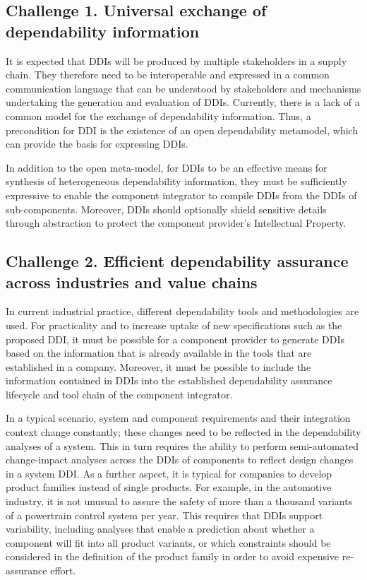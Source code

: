 \subsection{Challenge 1. Universal exchange of dependability information}
It is expected that DDIs will be produced by multiple stakeholders in a supply chain. They therefore need to be interoperable and expressed in a common communication language that can be understood by stakeholders and mechanisms undertaking the generation and evaluation of DDIs. Currently, there is a lack of a common model for the exchange of dependability information. Thus, a precondition for DDI is the existence of an open dependability metamodel, which can provide the basis for expressing DDIs. 

In addition to the open meta-model, for DDIs to be an effective means for synthesis of heterogeneous dependability information, they must be sufficiently expressive to enable the component integrator to compile DDIs from the DDIs of sub-components. Moreover, DDIs should optionally shield sensitive details through abstraction to protect the component provider’s Intellectual Property. 

\subsection{Challenge 2. Efficient dependability assurance across industries and value chains}
In current industrial practice, different dependability tools and methodologies are used. For practicality and to increase uptake of new specifications such as the proposed DDI, it must be possible for a component provider to generate DDIs based on the information that is already available in the tools that are established in a company. Moreover, it must be possible to include the information contained in DDIs into the established dependability assurance lifecycle and tool chain of the component integrator. 

In a typical scenario, system and component requirements and their integration context change constantly; these changes need to be reflected in the dependability analyses of a system. This in turn requires the ability to perform semi-automated change-impact analyses across the DDIs of components to reflect design changes in a system DDI. As a further aspect, it is typical for companies to develop product families instead of single products. For example, in the automotive industry, it is not unusual to assure the safety of more than a thousand variants of a powertrain control system per year. This requires that DDIs support variability, including analyses that enable a prediction about whether a component will fit into all product variants, or which constraints should be considered in the definition of the product family in order to avoid expensive re-assurance effort.

